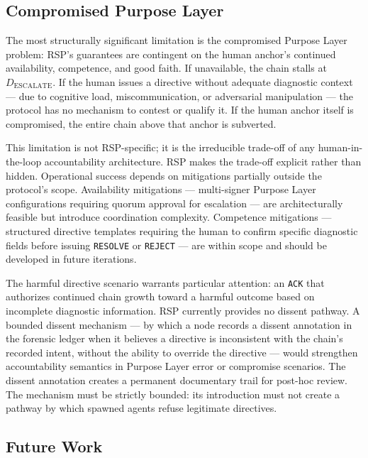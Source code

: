 \subsection{Compromised Purpose Layer}
\label{sec:rs-purpose-compromise}

The most structurally significant limitation is the compromised Purpose Layer problem: RSP's guarantees are contingent on the human anchor's continued availability, competence, and good faith. If unavailable, the chain stalls at $D_{\text{ESCALATE}}$. If the human issues a directive without adequate diagnostic context — due to cognitive load, miscommunication, or adversarial manipulation — the protocol has no mechanism to contest or qualify it. If the human anchor itself is compromised, the entire chain above that anchor is subverted.

This limitation is not RSP-specific; it is the irreducible trade-off of any human-in-the-loop accountability architecture. RSP makes the trade-off explicit rather than hidden. Operational success depends on mitigations partially outside the protocol's scope. Availability mitigations — multi-signer Purpose Layer configurations requiring quorum approval for escalation — are architecturally feasible but introduce coordination complexity. Competence mitigations — structured directive templates requiring the human to confirm specific diagnostic fields before issuing \texttt{RESOLVE} or \texttt{REJECT} — are within scope and should be developed in future iterations.

The harmful directive scenario warrants particular attention: an \texttt{ACK} that authorizes continued chain growth toward a harmful outcome based on incomplete diagnostic information. RSP currently provides no dissent pathway. A bounded dissent mechanism — by which a node records a dissent annotation in the forensic ledger when it believes a directive is inconsistent with the chain's recorded intent, without the ability to override the directive — would strengthen accountability semantics in Purpose Layer error or compromise scenarios. The dissent annotation creates a permanent documentary trail for post-hoc review. The mechanism must be strictly bounded: its introduction must not create a pathway by which spawned agents refuse legitimate directives.

\subsection{Future Work}
\label{sec:rs-future-work}

